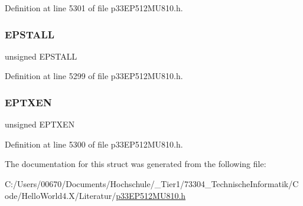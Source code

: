 Definition at line 5301 of file p33\+E\+P512\+M\+U810.\+h.

\mbox{\label{structtag_u1_e_p15_b_i_t_s_a47042104f04ebe06a23f9789bd400d7e}} 
\subsubsection{\texorpdfstring{E\+P\+S\+T\+A\+LL}{EPSTALL}}
{\footnotesize\ttfamily unsigned E\+P\+S\+T\+A\+LL}



Definition at line 5299 of file p33\+E\+P512\+M\+U810.\+h.

\mbox{\label{structtag_u1_e_p15_b_i_t_s_aa2d88c1be513e759c136823c86a355b4}} 
\subsubsection{\texorpdfstring{E\+P\+T\+X\+EN}{EPTXEN}}
{\footnotesize\ttfamily unsigned E\+P\+T\+X\+EN}



Definition at line 5300 of file p33\+E\+P512\+M\+U810.\+h.



The documentation for this struct was generated from the following file\+:\begin{DoxyCompactItemize}
\item 
C\+:/\+Users/00670/\+Documents/\+Hochschule/\+\_\+\+Tier1/73304\+\_\+\+Technische\+Informatik/\+Code/\+Hello\+World4.\+X/\+Literatur/\hyperlink{p33_e_p512_m_u810_8h}{p33\+E\+P512\+M\+U810.\+h}\end{DoxyCompactItemize}
